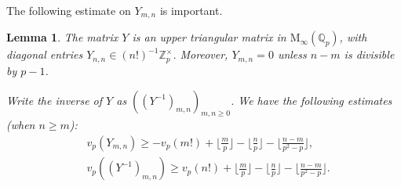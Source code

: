 \documentclass[12pt]{amsart}
\newtheorem{lemma}[subsection]{Lemma}
\theoremstyle{definition}
\numberwithin{equation}{subsection}
\def\QQ{\mathbb{Q}}
\def\ZZ{\mathbb{Z}}
\def\rmM{\mathrm{M}}
\begin{document}
The following estimate on $Y_{m,n}$ is important.
\begin{lemma}
\label{L:estimate of Y} The matrix $Y$ is an upper triangular matrix in $\rmM_\infty(\QQ_p)$, with diagonal entries $Y_{n,n} \in(n!)^{-1} \ZZ_p^\times$. 
Moreover, $Y_{m,n} = 0$ unless $n-m$ is divisible by $p-1$.

Write the inverse of $Y$ as $((Y^{-1})_{m,n})_{m,n\geq0}$. We have the following estimates (when $n\geq m$): 
\begin{eqnarray}
\label{E:vp(Y)}&\displaystyle
v_p(Y_{m,n}) \geq  -v_p(m!) + \Big\lfloor \frac mp\Big\rfloor-\Big\lfloor \frac np\Big\rfloor- \Big\lfloor \frac{n-m}{p^2-p}\Big\rfloor,
\\
\label{E:vp(Y-1)}&\displaystyle
v_p((Y^{-1})_{m,n})\geq  v_p(n!) + \Big\lfloor \frac mp\Big\rfloor-\Big\lfloor \frac np\Big\rfloor- \Big\lfloor \frac{n-m}{p^2-p}\Big\rfloor.
\end{eqnarray}
\end{lemma}
\end{document}
